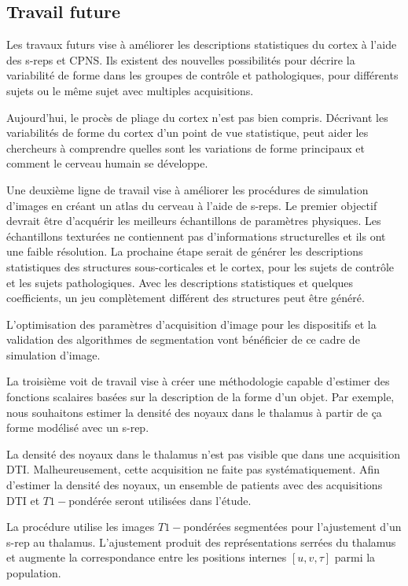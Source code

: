 \subsection{Travail future}

Les travaux futurs vise à améliorer les descriptions statistiques du cortex à l'aide des s-reps et CPNS.
Ils existent des nouvelles possibilités pour 
décrire la variabilité de forme dans les groupes de contrôle et pathologiques, 
pour différents sujets ou le même sujet avec multiples acquisitions.

Aujourd'hui, le procès de pliage du cortex n'est pas bien compris.
Décrivant les variabilités de forme du cortex d'un point de vue statistique,
peut aider les chercheurs à comprendre quelles sont les
variations de forme principaux et comment le cerveau humain se développe.

Une deuxième ligne de travail vise à améliorer les procédures de simulation d'images
en créant un atlas du cerveau à l'aide de s-reps.
Le premier objectif devrait être d'acquérir les meilleurs échantillons de paramètres physiques.
Les échantillons texturées ne contiennent pas d'informations structurelles et ils ont une faible résolution.
La prochaine étape serait de générer 
les descriptions statistiques des structures sous-corticales et le cortex,
pour les sujets de contrôle et les sujets pathologiques.
Avec les descriptions statistiques et quelques coefficients, un jeu complètement différent des structures peut être généré.

L'optimisation des paramètres d'acquisition d'image pour les dispositifs et la validation des algorithmes de segmentation 
vont bénéficier de ce cadre de simulation d'image.

La troisième voit de travail vise à créer 
une méthodologie capable d'estimer des fonctions scalaires basées sur la description de la forme d'un objet.
Par exemple, nous souhaitons estimer la densité des noyaux dans le thalamus
à partir de ça forme modélisé avec un s-rep.

La densité des noyaux dans le thalamus n'est pas visible que dans une acquisition DTI.
Malheureusement, cette acquisition ne faite pas systématiquement.
Afin d'estimer la densité des noyaux,
un ensemble de patients avec des acquisitions DTI et $T1-$pondérée
seront utilisées dans l'étude.

La procédure utilise les images $T1-$pondérées segmentées pour l'ajustement d'un s-rep au thalamus.
L'ajustement produit des représentations serrées du thalamus 
et augmente la correspondance entre les positions internes $[u, v, \tau]$ parmi la population.

